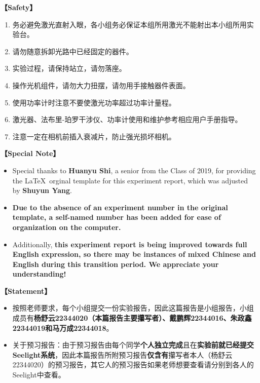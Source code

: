 \textbf{【Safety】}	
\begin{enumerate}
	\item 务必避免激光直射入眼，各小组务必保证本组所用激光不能射出本小组所用实验台。
	\item 请勿随意拆卸光路中已经固定的器件。
	\item 实验过程，请保持站立，请勿落座。
	\item 操作光机组件，请勿大力扭摆，请勿用手接触器件表面。
	\item 使用功率计时注意不要使激光功率超过功率计量程。
	\item 激光器、法布里-珀罗干涉仪、功率计使用和维护参考相应用户手册指导。
	\item 注意一定在相机前插入衰减片，防止强光损坏相机。
\end{enumerate}	
	
	
\textbf{【Special Note】}	
\begin{itemize}
	\item Special thanks to \textbf{Huanyu Shi}, a senior from the Class of 2019, for providing the \LaTeX \ orginal template for this experiment report, which was adjusted by \textbf{Shuyun Yang}. 
	
	\item \textbf{Due to the absence of an experiment number in the original template, a self-named number has been added for ease of organization on the computer.} 
	
	\item Additionally, \textcolor{fred}{\large\textbf{this experiment report is being improved towards full English expression, so there may be instances of mixed Chinese and English during this transition period. We appreciate your understanding!}}
\end{itemize}

\textbf{【Statement】}
\begin{itemize}
	\LARGE\item 按照老师要求，每个小组提交一份实验报告，因此这篇报告是小组报告，小组成员有\textcolor{fred}{\textbf{杨舒云22344020（本篇报告主要攥写者）、戴鹏辉22344016、朱政鑫22344019和马万成22344018}}。
	
	\item 关于预习报告：由于预习报告由每个同学\textbf{个人独立完成}且在\textbf{实验前就已经提交Seelight系统}，因此本篇报告所附预习报告\textbf{仅含有}攥写者本人（杨舒云22344020）的预习报告，其它人的预习报告如果老师想要查看请分别到各人的Seelight中查看。
\end{itemize}


\clearpage
\tableofcontents		